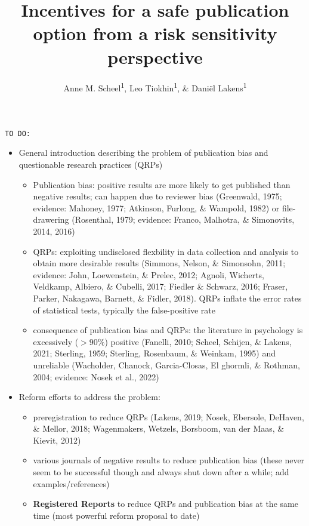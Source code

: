 \documentclass[british,,doc,mask,floatsintext]{apa6}
\title{Incentives for a safe publication option from a risk sensitivity perspective}
\author{Anne M. Scheel\textsuperscript{1}, Leo Tiokhin\textsuperscript{1}, \& Daniël Lakens\textsuperscript{1}}
\date{}
\affiliation{\vspace{0.5cm}\textsuperscript{1} Eindhoven University of Technology}
\providecommand{\tightlist}{%
  \setlength{\itemsep}{0pt}\setlength{\parskip}{0pt}}
\begin{document}
\maketitle

\texttt{TO\ DO:}

\begin{itemize}
\tightlist
\item
  General introduction describing the problem of publication bias and questionable research practices (QRPs)

  \begin{itemize}
  \tightlist
  \item
    Publication bias: positive results are more likely to get published than negative results; can happen due to reviewer bias (Greenwald, 1975; evidence: Mahoney, 1977; Atkinson, Furlong, \& Wampold, 1982) or file-drawering (Rosenthal, 1979; evidence: Franco, Malhotra, \& Simonovits, 2014, 2016)
  \item
    QRPs: exploiting undisclosed flexbility in data collection and analysis to obtain more desirable results (Simmons, Nelson, \& Simonsohn, 2011; evidence: John, Loewenstein, \& Prelec, 2012; Agnoli, Wicherts, Veldkamp, Albiero, \& Cubelli, 2017; Fiedler \& Schwarz, 2016; Fraser, Parker, Nakagawa, Barnett, \& Fidler, 2018). QRPs inflate the error rates of statistical tests, typically the false-positive rate
  \item
    consequence of publication bias and QRPs: the literature in psychology is excessively (\(>90\%\)) positive (Fanelli, 2010; Scheel, Schijen, \& Lakens, 2021; Sterling, 1959; Sterling, Rosenbaum, \& Weinkam, 1995) and unreliable (Wacholder, Chanock, Garcia-Closas, El ghormli, \& Rothman, 2004; evidence: Nosek et al., 2022)
  \end{itemize}
\item
  Reform efforts to address the problem:

  \begin{itemize}
  \tightlist
  \item
    preregistration to reduce QRPs (Lakens, 2019; Nosek, Ebersole, DeHaven, \& Mellor, 2018; Wagenmakers, Wetzels, Borsboom, van der Maas, \& Kievit, 2012)
  \item
    various journals of negative results to reduce publication bias (these never seem to be successful though and always shut down after a while; add examples/references)
  \item
    \textbf{Registered Reports} to reduce QRPs and publication bias at the same time (most powerful reform proposal to date)
  \end{itemize}
\end{itemize}
\end{document}
